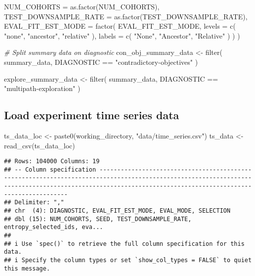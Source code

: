\documentclass[
]{book}
\newenvironment{Shaded}{\begin{snugshade}}{\end{snugshade}}
\newcommand{\AttributeTok}[1]{\textcolor[rgb]{0.77,0.63,0.00}{#1}}
\newcommand{\CommentTok}[1]{\textcolor[rgb]{0.56,0.35,0.01}{\textit{#1}}}
\newcommand{\FunctionTok}[1]{\textcolor[rgb]{0.00,0.00,0.00}{#1}}
\newcommand{\NormalTok}[1]{#1}
\newcommand{\OtherTok}[1]{\textcolor[rgb]{0.56,0.35,0.01}{#1}}
\newcommand{\SpecialCharTok}[1]{\textcolor[rgb]{0.00,0.00,0.00}{#1}}
\newcommand{\StringTok}[1]{\textcolor[rgb]{0.31,0.60,0.02}{#1}}
\begin{document}
\begin{Shaded}
\begin{Highlighting}[]
    \AttributeTok{NUM\_COHORTS =} \FunctionTok{as.factor}\NormalTok{(NUM\_COHORTS),}
    \AttributeTok{TEST\_DOWNSAMPLE\_RATE =} \FunctionTok{as.factor}\NormalTok{(TEST\_DOWNSAMPLE\_RATE),}
    \AttributeTok{EVAL\_FIT\_EST\_MODE =} \FunctionTok{factor}\NormalTok{(}
\NormalTok{      EVAL\_FIT\_EST\_MODE,}
      \AttributeTok{levels =} \FunctionTok{c}\NormalTok{(}
        \StringTok{"none"}\NormalTok{,}
        \StringTok{"ancestor"}\NormalTok{,}
        \StringTok{"relative"}
\NormalTok{      ),}
      \AttributeTok{labels =} \FunctionTok{c}\NormalTok{(}
        \StringTok{"None"}\NormalTok{,}
        \StringTok{"Ancestor"}\NormalTok{,}
        \StringTok{"Relative"}
\NormalTok{      )}
\NormalTok{    )}
\NormalTok{  )}

\CommentTok{\# Split summary data on diagnostic}
\NormalTok{con\_obj\_summary\_data }\OtherTok{\textless{}{-}} \FunctionTok{filter}\NormalTok{(}
\NormalTok{  summary\_data,}
\NormalTok{  DIAGNOSTIC }\SpecialCharTok{==} \StringTok{"contradictory{-}objectives"}
\NormalTok{)}

\NormalTok{explore\_summary\_data }\OtherTok{\textless{}{-}} \FunctionTok{filter}\NormalTok{(}
\NormalTok{  summary\_data,}
\NormalTok{  DIAGNOSTIC }\SpecialCharTok{==} \StringTok{"multipath{-}exploration"}
\NormalTok{)}
\end{Highlighting}
\end{Shaded}

\hypertarget{load-experiment-time-series-data}{%
\subsection{Load experiment time series data}\label{load-experiment-time-series-data}}

\begin{Shaded}
\begin{Highlighting}[]
\NormalTok{ts\_data\_loc }\OtherTok{\textless{}{-}} \FunctionTok{paste0}\NormalTok{(working\_directory, }\StringTok{"data/time\_series.csv"}\NormalTok{)}
\NormalTok{ts\_data }\OtherTok{\textless{}{-}} \FunctionTok{read\_csv}\NormalTok{(ts\_data\_loc)}
\end{Highlighting}
\end{Shaded}

\begin{verbatim}
## Rows: 104000 Columns: 19
## -- Column specification ---------------------------------------------------------------------------------------------------------------------------------------------------------------------------------------------------------
## Delimiter: ","
## chr  (4): DIAGNOSTIC, EVAL_FIT_EST_MODE, EVAL_MODE, SELECTION
## dbl (15): NUM_COHORTS, SEED, TEST_DOWNSAMPLE_RATE, entropy_selected_ids, eva...
## 
## i Use `spec()` to retrieve the full column specification for this data.
## i Specify the column types or set `show_col_types = FALSE` to quiet this message.
\end{verbatim}
\end{document}
